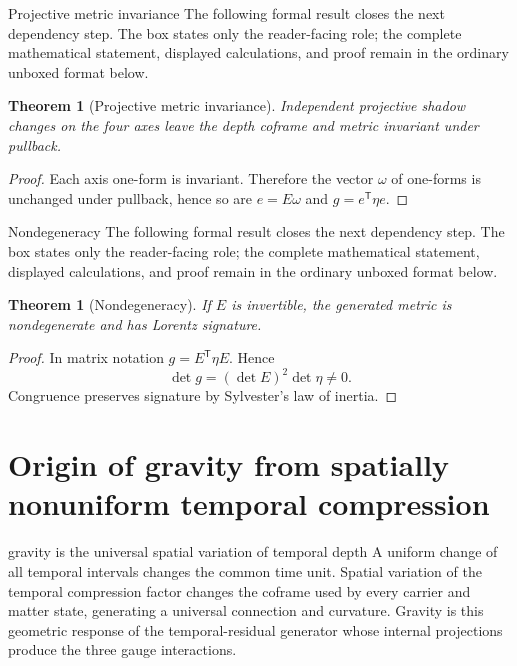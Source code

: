 \documentclass[11pt]{article}
\numberwithin{equation}{section}
\newtheorem{theorem}[definition]{Theorem}
\theoremstyle{remark}
\begin{document}
\begin{proofguide}{Projective metric invariance}
The following formal result closes the next dependency step. The box states only the reader-facing role; the complete mathematical statement, displayed calculations, and proof remain in the ordinary unboxed format below.
\end{proofguide}
\begin{theorem}[Projective metric invariance]
Independent projective shadow changes on the four axes leave the depth coframe and metric invariant under pullback.
\end{theorem}
\begin{proof}
Each axis one-form is invariant. Therefore the vector $\omega$ of one-forms is unchanged under pullback, hence so are $e=E\omega$ and $g=e^{\mathsf T}\eta e$.
\end{proof}

\begin{proofguide}{Nondegeneracy}
The following formal result closes the next dependency step. The box states only the reader-facing role; the complete mathematical statement, displayed calculations, and proof remain in the ordinary unboxed format below.
\end{proofguide}
\begin{theorem}[Nondegeneracy]
If $E$ is invertible, the generated metric is nondegenerate and has Lorentz signature.
\end{theorem}
\begin{proof}
In matrix notation $g=E^{\mathsf T}\eta E$. Hence
\begin{equation}
\det g=(\det E)^2\det\eta\neq0.
\end{equation}
Congruence preserves signature by Sylvester's law of inertia.
\end{proof}

\section{Origin of gravity from spatially nonuniform temporal compression}
\begin{conceptledger}{gravity is the universal spatial variation of temporal depth}
A uniform change of all temporal intervals changes the common time unit. Spatial variation of the temporal compression factor changes the coframe used by every carrier and matter state, generating a universal connection and curvature. Gravity is this geometric response of the temporal-residual generator whose internal projections produce the three gauge interactions.
\end{conceptledger}
\end{document}
